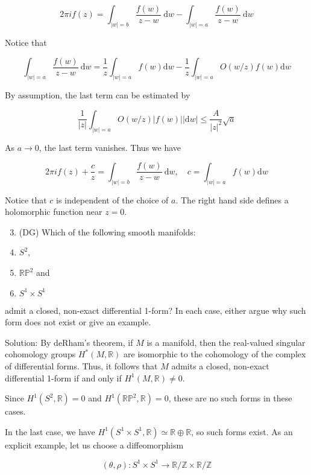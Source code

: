 \documentclass[10pt]{article}
\begin{document}
$$
2 \pi i f(z)=\int_{|w|=b} \frac{f(w)}{z-w} \mathrm{~d} w-\int_{|w|=a} \frac{f(w)}{z-w} \mathrm{~d} w
$$

Notice that

$$
\int_{|w|=a} \frac{f(w)}{z-w} \mathrm{~d} w=\frac{1}{z} \int_{|w|=a} f(w) \mathrm{d} w-\frac{1}{z} \int_{|w|=a} O(w / z) f(w) \mathrm{d} w
$$

By assumption, the last term can be estimated by

$$
\frac{1}{|z|} \int_{|w|=a} O(w / z)|f(w)||\mathrm{d} w| \leq \frac{A}{|z|^{2}} \sqrt{a}
$$

As $a \rightarrow 0$, the last term vanishes. Thus we have

$$
2 \pi i f(z)+\frac{c}{z}=\int_{|w|=b} \frac{f(w)}{z-w} \mathrm{~d} w, \quad c=\int_{|w|=a} f(w) \mathrm{d} w
$$

Notice that $c$ is independent of the choice of $a$. The right hand side defines a holomorphic function near $z=0$.

\begin{enumerate}
  \setcounter{enumi}{2}
  \item (DG) Which of the following smooth manifolds:

  \item $S^{2}$,

  \item $\mathbb{R P}^{2}$ and

  \item $S^{1} \times S^{1}$

\end{enumerate}

admit a closed, non-exact differential 1-form? In each case, either argue why such form does not exist or give an example.

Solution: By deRham's theorem, if $M$ is a manifold, then the real-valued singular cohomology groups $H^{*}(M, \mathbb{R})$ are isomorphic to the cohomology of the complex of differential forms. Thus, it follows that $M$ admits a closed, non-exact differential 1-form if and only if $H^{1}(M, \mathbb{R}) \neq 0$.

Since $H^{1}\left(S^{2}, \mathbb{R}\right)=0$ and $H^{1}\left(\mathbb{R P}^{2}, \mathbb{R}\right)=0$, these are no such forms in these cases.

In the last case, we have $H^{1}\left(S^{1} \times S^{1}, \mathbb{R}\right) \simeq \mathbb{R} \oplus \mathbb{R}$, so such forms exist. As an explicit example, let us choose a diffeomorphism

$$
(\theta, \rho): S^{1} \times S^{1} \rightarrow \mathbb{R} / \mathbb{Z} \times \mathbb{R} / \mathbb{Z}
$$
\end{document}

